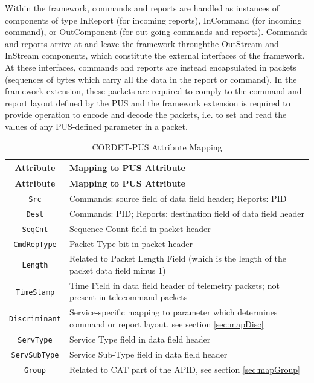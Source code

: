 \documentclass[a4paper,10pt]{article}
\begin{document}
Within the framework, commands and reports are handled as instances of components of type InReport (for incoming reports), InCommand (for incoming command), or OutComponent (for out-going commands and reports). Commands and reports arrive at and leave the framework throughthe OutStream and InStream components, which constitute the external interfaces of the framework. At these interfaces, commands and reports are instead encapsulated in packets (sequences of bytes which carry all the data in the report or command). In the framework extension, these packets are required to comply to the command and report layout defined by the PUS and the framework extension is required to provide operation to encode and decode the packets, i.e. to set and read the values of any PUS-defined parameter in a packet. 

\begin{longtable}{|c|>{\raggedright\arraybackslash}p{11cm}|}
\caption{CORDET-PUS Attribute Mapping}\label{tab:pcktAttPus} \\
\hline
\rowcolor{light-gray}
\textbf{Attribute} & \textbf{Mapping to PUS Attribute} \\
\hline\hline
\endfirsthead
\rowcolor{light-gray}
\textbf{Attribute} & \textbf{Mapping to PUS Attribute} \\
\hline\hline
\endhead
\texttt{Src} & Commands: source field of data field header; Reports: PID \\
\hline
\texttt{Dest} & Commands: PID; Reports: destination field of data field header \\
\hline
\texttt{SeqCnt} & Sequence Count field in packet header \\
\hline
\texttt{CmdRepType} & Packet Type bit in packet header \\
\hline
\texttt{Length} & Related to Packet Length Field (which is the length of the packet data field minus 1) \\
\hline
\texttt{TimeStamp} & Time Field in data field header of telemetry packets; not present in telecommand packets \\
\hline
\texttt{Discriminant} & Service-specific mapping to parameter which determines command or report layout, see section \ref{sec:mapDisc} \\
\hline
\texttt{ServType} & Service Type field in data field header \\
\hline
\texttt{ServSubType} & Service Sub-Type field in data field header \\
\hline
\texttt{Group} & Related to CAT part of the APID, see section \ref{sec:mapGroup} \\

\end{longtable}
\end{document}
